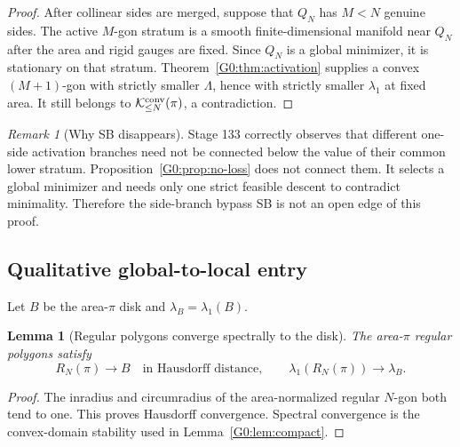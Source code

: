 \documentclass[11pt]{amsart}
\numberwithin{equation}{section}
\newtheorem{lemma}[theorem]{Lemma}
\theoremstyle{definition}
\theoremstyle{remark}
\newtheorem{remark}[theorem]{Remark}
\newcommand{\Kclass}{\mathcal K}
\newcommand{\LambdaF}{\Lambda}
\begin{document}
\begin{proof}
After collinear sides are merged, suppose that $Q_N$ has $M<N$ genuine
sides.  The active $M$-gon stratum is a smooth finite-dimensional
manifold near $Q_N$ after the area and rigid gauges are fixed.  Since
$Q_N$ is a global minimizer, it is stationary on that stratum.
Theorem~\ref{G0:thm:activation} supplies a convex $(M+1)$-gon with strictly
smaller $\LambdaF$, hence with strictly smaller $\lambda_1$ at fixed
area.  It still belongs to $\Kclass_{\le N}^{\rm conv}(\pi)$, a
contradiction.
\end{proof}

\begin{remark}[Why SB disappears]
Stage 133 correctly observes that different one-side activation branches
need not be connected below the value of their common lower stratum.
Proposition~\ref{G0:prop:no-loss} does not connect them.  It selects a global
minimizer and needs only one strict feasible descent to contradict
minimality.  Therefore the side-branch bypass SB is not an open edge of
this proof.
\end{remark}

\subsection{Qualitative global-to-local entry}

Let $B$ be the area-$\pi$ disk and
$\lambda_B=\lambda_1(B)$.

\begin{lemma}[Regular polygons converge spectrally to the disk]
\label{G0:lem:regular-limit}
The area-$\pi$ regular polygons satisfy
\begin{equation}\label{G0:eq:regular-limit}
 R_N(\pi)\longrightarrow B\quad\text{in Hausdorff distance},
 \qquad
 \lambda_1(R_N(\pi))\longrightarrow\lambda_B.
\end{equation}
\end{lemma}

\begin{proof}
The inradius and circumradius of the area-normalized regular $N$-gon both
tend to one.  This proves Hausdorff convergence.  Spectral convergence is
the convex-domain stability used in Lemma~\ref{G0:lem:compact}.
\end{proof}
\end{document}
